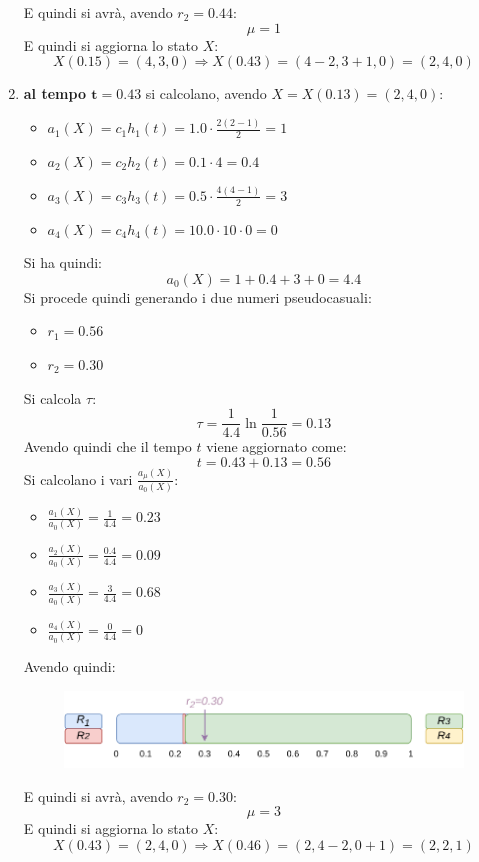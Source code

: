 \documentclass{article}
\begin{document}
\begin{enumerate}[label=\roman*)]
\begin{figure}[H]
  \end{figure}
  E quindi si avrà, avendo $r_2=0.44$:
  \[\mu=1\]
  E quindi si aggiorna lo stato $X$:
  \[X(0.15) = (4,3,0) \Rightarrow X(0.43) = (4-2,3+1,0) = (2,4,0)\]
  \newpage
  \item \textbf{al tempo $\mathbf{t=0.43}$} si calcolano, avendo
  $X=X(0.13)=(2,4,0)$: 
  \begin{multicols}{2}
    \begin{itemize}
      \item $a_1(X)=c_1h_1(t)=1.0\cdot\frac{2(2-1)}{2}=1$
      \item $a_2(X)=c_2h_2(t)=0.1\cdot 4=0.4$
      \item $a_3(X)=c_3h_3(t)=0.5\cdot \frac{4(4-1)}{2}=3$
      \item $a_4(X)=c_4h_4(t)=10.0\cdot 10 \cdot 0=0$
    \end{itemize}
  \end{multicols}
  Si ha quindi:
  \[a_0(X)=1+0.4+3+0=4.4\]
  Si procede quindi generando i due numeri pseudocasuali:
  \begin{multicols}{2}
    \begin{itemize}
      \item $r_1=0.56$
      \item $r_2=0.30$
    \end{itemize}
  \end{multicols}
  Si calcola $\tau$:
  \[\tau=\frac{1}{4.4}\ln\frac{1}{0.56}=0.13\]
  Avendo quindi che il tempo $t$ viene aggiornato come:
  \[t=0.43+0.13=0.56\]
  Si calcolano i vari $\frac{a_\mu(X)}{a_0(X)}$:
  \begin{multicols}{2}
    \begin{itemize}
      \item $\frac{a_1(X)}{a_0(X)}=\frac{1}{4.4}=0.23$
      \item $\frac{a_2(X)}{a_0(X)}=\frac{0.4}{4.4}=0.09$
      \item $\frac{a_3(X)}{a_0(X)}=\frac{3}{4.4}=0.68$
      \item $\frac{a_4(X)}{a_0(X)}=\frac{0}{4.4}=0$
    \end{itemize}
  \end{multicols}
  Avendo quindi:
  \begin{figure}[H]
    \centering
    \includegraphics[scale = 0.8]{img/t5.pdf}
  \end{figure}
  E quindi si avrà, avendo $r_2=0.30$:
  \[\mu=3\]
  E quindi si aggiorna lo stato $X$:
  \[X(0.43) = (2,4,0) \Rightarrow X(0.46) = (2,4-2,0+1) = (2,2,1)\]
\end{enumerate}
\end{document}
